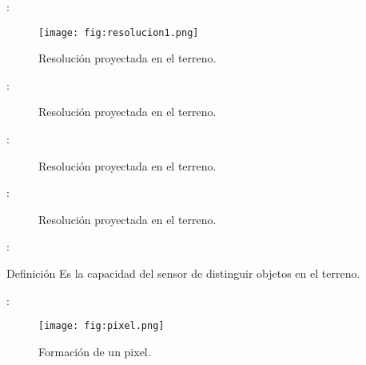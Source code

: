 \begin{frame}{\secname : \subsecname}
  \begin{figure}
    \centering
    \texttt{[image: fig:resolucion1.png]}
    \caption{Resolución proyectada en el terreno.}
    \label{}
  \end{figure}
\end{frame}

\begin{frame}{\secname : \subsecname}
  \begin{figure}
    \centering
    \caption{Resolución proyectada en el terreno.}
    \label{}
  \end{figure}
\end{frame}

\begin{frame}{\secname : \subsecname}
  \begin{figure}
    \centering
    \caption{Resolución proyectada en el terreno.}
    \label{}
  \end{figure}
\end{frame}

\begin{frame}{\secname : \subsecname}
  \begin{figure}
    \centering
    \caption{Resolución proyectada en el terreno.}
    \label{}
  \end{figure}
\end{frame}

\begin{frame}{\secname : \subsecname}
    \begin{block}{Definición}
        Es la capacidad del sensor de distinguir objetos en el terreno.%
    \end{block}
\end{frame}
\begin{frame}{\secname : \subsecname}
    \begin{figure}[h!]
        \centering
        \texttt{[image: fig:pixel.png]}
        \caption{Formación de un  pixel.}
    \end{figure}
\end{frame}

